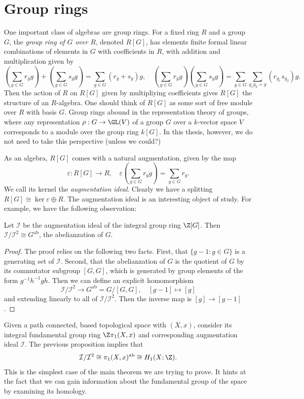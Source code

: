 \appendix
\section{Group rings} One important class of algebras are group rings. For a fixed ring $R$ and a group $G$, the \emph{group ring of $G$ over $R$}, denoted $R[G]$, has elements finite formal linear combinations of elements in $G$ with coefficients in $R$, with addition and multiplication given by
\[(\sum_{g \in G} r_g g)+ (\sum_{g \in G}s_g g) = \sum_{g \in G}(r_g+s_g)g,\quad (\sum_{g \in G} r_g g)(\sum_{g \in G}s_g g) = \sum_{g \in G}\sum_{g_1g_2=g} (r_{g_1}s_{g_2})g.\]
Then the action of $R$ on $R[G]$ given by multipliying coefficients gives $R[G]$ the structure of an $R$-algebra. One should think of $R[G]$ as some sort of free module over $R$ with basis $G$. Group rings abound in the representation theory of groups, where any representation $\rho: G\to \GL(V)$ of a group $G$ over a $k$-vector space $V$ corresponds to a module over the group ring $k[G]$. In this thesis, however, we do not need to take this perspective (unless we could?)

As an algebra, $R[G]$ comes with a natural augmentation, given by the map
\[\varepsilon: R[G]\to R,\quad \varepsilon(\sum_{g\in G}r_gg) = \sum_{g\in G}r_g.\]
We call its kernel the \emph{augmentation ideal}. Clearly we have a splitting $R[G] \cong \ker \varepsilon \oplus R$. The augmentation ideal is an interesting object of study. For example, we have the following observation: 
\begin{prop}
    Let $\mathcal{I}$ be the augmentation ideal of the integral group ring $\Z[G]$. Then $\mathcal{I}/\mathcal{I}^2\cong G^\mathrm{ab}$, the abelianzation of $G$.
    \begin{proof}
        The proof relies on the following two facts. First, that $\{g-1: g\in G\}$ is a generating set of $\mathcal{I}$. Second, that the abelianzation of $G$ is the quotient of $G$ by its commutator subgroup $[G,G]$, which is generated by group elements of the form $g^{-1}h^{-1}gh$. Then we can define an explicit homomorphism
        \[\mathcal{I}/\mathcal{I}^2 \to G^\mathrm{ab} = G/[G,G], \quad [g-1] \mapsto [g]\]
        and extending linearly to all of $\mathcal{I}/\mathcal{I}^2$. Then the inverse map is $[g] \to [g-1]$.
    \end{proof}
\end{prop}
Given a path connected, based topological space with $(X,x)$, consider its integral fundamental group ring $\Z\pi_1(X,x)$ and corresponding augmentation ideal $\mathcal{I}$. The previous proposition implies that 
\[\mathcal{I}/\mathcal{I}^2 \cong \pi_1(X,x)^\mathrm{ab} \cong H_1(X; \Z).\]
This is the simplest case of the main theorem we are trying to prove. It hints at the fact that we can gain information about the fundamental group of the space by examining its homology.


